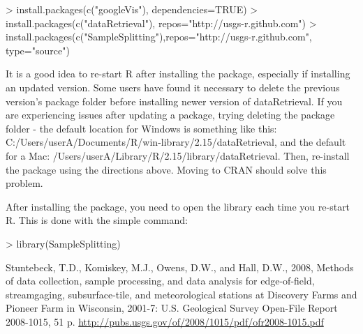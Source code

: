 \documentclass[a4paper,11pt]{article}
\begin{document}
\begin{Schunk}
\begin{Sinput}
> install.packages(c("googleVis"), dependencies=TRUE)
> install.packages(c("dataRetrieval"), repos="http://usgs-r.github.com")
> install.packages(c("SampleSplitting"),repos="http://usgs-r.github.com",
                  type="source")
\end{Sinput}
\end{Schunk}

It is a good idea to re-start R after installing the package, especially if installing an updated version. Some users have found it necessary to delete the previous version's package folder before installing newer version of dataRetrieval. If you are experiencing issues after updating a package, trying deleting the package folder - the default location for Windows is something like this: C:/Users/userA/Documents/R/win-library/2.15/dataRetrieval, and the default for a Mac: 
/Users/userA/Library/R/2.15/library/dataRetrieval. Then, re-install the package using the directions above. Moving to CRAN should solve this problem.

After installing the package, you need to open the library each time you re-start R.  This is done with the simple command:
\begin{Schunk}
\begin{Sinput}
> library(SampleSplitting)
\end{Sinput}
\end{Schunk}

\clearpage

\begin{thebibliography}{10}

Stuntebeck, T.D., Komiskey, M.J., Owens, D.W., and Hall, D.W., 2008, Methods of data collection, sample processing, and data analysis for edge-of-field, streamgaging, subsurface-tile, and meteorological stations at Discovery Farms and Pioneer Farm in Wisconsin, 2001-7: U.S. Geological Survey Open-File Report 2008-1015, 51 p.
\url{http://pubs.usgs.gov/of/2008/1015/pdf/ofr2008-1015.pdf}

\end{thebibliography}
\end{document}
